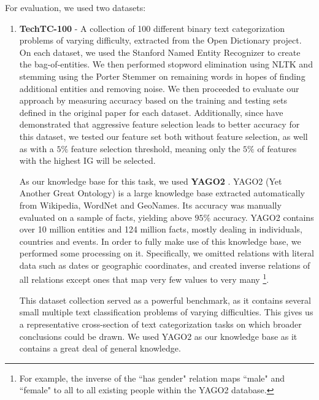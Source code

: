 \documentclass[twoside,11pt]{article}
\theoremstyle{definition}
\begin{document}
For evaluation, we used two datasets: 
\begin{enumerate}
	\item \textbf{TechTC-100} \cite{gabrilovich2004text} - A collection of 100 different binary text categorization problems of varying difficulty, extracted from the Open Dictionary project. On each dataset, we used the Stanford Named Entity Recognizer \cite{finkel2005incorporatingfull} to create the bag-of-entities. We then performed stopword elimination using NLTK \cite{bird2009natural} and stemming using the Porter Stemmer \cite{van1980new} on remaining words in hopes of finding additional entities and removing noise.
	We then proceeded to evaluate our approach by measuring accuracy based on the training and testing sets defined in the original paper for each dataset. Additionally, since  have demonstrated that aggressive feature selection leads to better accuracy for this dataset, we tested our feature set both without feature selection, as well as with a $5\%$ feature selection threshold, meaning only the $5\%$ of features with the highest IG will be selected. %
	
	As our knowledge base for this task, we used \textbf{YAGO2} \cite{hoffart2013yago2}.
	YAGO2 (Yet Another Great Ontology) is a large knowledge base extracted automatically from Wikipedia, WordNet and GeoNames. Its accuracy was manually evaluated on a sample of facts, yielding above $95\%$ accuracy.
	 YAGO2 contains over 10 million entities and 124 million facts, mostly dealing in individuals, countries and events.
	In order to fully make use of this knowledge base, we performed some processing on it. Specifically, we omitted relations with literal data such as dates or geographic coordinates, and created inverse relations of all relations except ones that map very few values to very many \footnote{For example, the inverse of the ``has gender" relation  maps ``male" and ``female" to all to all existing people within the YAGO2 database.}.
	
	This dataset collection served as a powerful benchmark, as it contains several small multiple text classification problems of varying difficulties. This gives us a representative cross-section of text categorization tasks on which broader conclusions could be drawn. We used YAGO2 as our knowledge base as it contains a great deal of general knowledge.
	

\end{enumerate}
\end{document}
